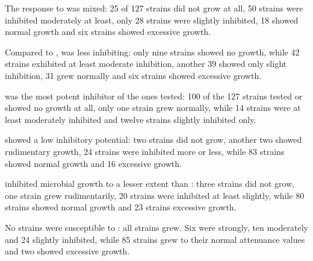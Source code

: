 The response to \textbf{\fur{}} was mixed: 25 of 127 strains did not grow at all, 50 strains were inhibited moderately at least, only 28 strains were slightly inhibited, 18 showed normal growth and six strains showed excessive growth.

Compared to \fur{}, \textbf{\hmf{}} was less inhibiting: only nine strains showed no growth, while 42 strains exhibited at least moderate inhibition, another 39 showed only slight inhibition, 31 grew normally and six strains showed excessive growth.

\textbf{\VAN{}} was the most potent inhibitor of the ones tested: 100 of the 127 strains tested or  showed no growth at all, only one strain grew normally, while 14 strains were at least moderately inhibited and twelve strains slightly inhibited only.

\textbf{\Acet{}} showed a low inhibitory potential: two strains did not grow, another two showed rudimentary growth, 24 strains were inhibited more or less, while 83 strains showed normal growth and 16 excessive growth.

\textbf{\Fora{}} inhibited microbial growth to a lesser extent than \acet{}: three strains did not grow, one strain grew rudimentarily, 20 strains were inhibited at least slightly, while 80 strains showed normal growth and 23 strains excessive growth.

No strains were susceptible to \textbf{\laev{}}: all strains grew. Six were strongly, ten moderately and 24 slightly inhibited, while 85 strains grew to their normal attenuance values and two showed excessive growth.

